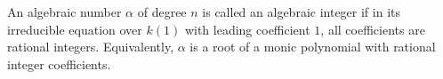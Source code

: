 An algebraic number $\alpha$ of degree $n$ is called an algebraic integer if in its irreducible equation over $k(1)$ with leading coefficient $1$, all coefficients are rational integers. Equivalently, $\alpha$ is a root of a monic polynomial with rational integer coefficients.
